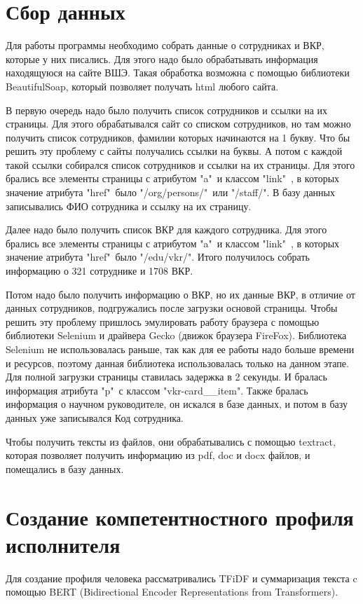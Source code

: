 \documentclass[PI,KR]{HSEUniversity}
\begin{document}
\section{Сбор данных}
Для работы программы необходимо собрать данные о сотрудниках и ВКР, которые у них писались. Для этого надо было обрабатывать информация находящуюся на сайте ВШЭ. Такая обработка возможна с помощью библиотеки BeautifulSoap, который позволяет получать html любого сайта.

В первую очередь надо было получить список сотрудников и ссылки на их страницы. Для этого обрабатывался сайт со списком сотрудников, но там можно получить список сотрудников, фамилии которых начинаются на 1 букву. Что бы решить эту проблему с сайты получались ссылки на буквы. А потом с каждой такой ссылки собирался список сотрудников и ссылки на их страницы. Для этого брались все элементы страницы с атрибутом "a"\ и классом "link"\ , в которых значение атрибута "href"\ было "/org/persons/"\ или "/staff/". В базу данных записывались ФИО сотрудника и ссылку на их страницу. 

Далее надо было получить список ВКР для каждого сотрудника. Для этого брались все элементы страницы с атрибутом "a"\ и классом "link"\ , в которых значение атрибута "href"\ было "/edu/vkr/". Итого получилось собрать информацию о 321 сотруднике и 1708 ВКР.

Потом надо было получить информацию о ВКР, но их данные ВКР, в отличие от данных сотрудников, подгружались после загрузки основой страницы. Чтобы решить эту проблему пришлось эмулировать работу браузера с помощью библиотеки Selenium и драйвера Gecko (движок браузера FireFox). Библиотека Selenium не использовалась раньше, так как для ее работы надо больше времени и ресурсов, поэтому данная библиотека использовалась только на данном этапе. Для полной загрузки страницы ставилась задержка в 2 секунды. И бралась информация атрибута "p"\ с классом "vkr-card\_\_item". Также бралась информация о научном руководителе, он искался в базе данных, и потом в базу данных уже записывался Код сотрудника.

Чтобы получить тексты из файлов, они обрабатывались с помощью textract, которая позволяет получить информацию из pdf, doc и docx файлов, и помещались в базу данных.
\section{Создание компетентностного профиля исполнителя}
Для создание профиля человека рассматривались TFiDF \cite{das2018improved} и суммаризация текста c помощью BERT \cite{devlin2019bert} (Bidirectional Encoder Representations from Transformers). 
\end{document}
